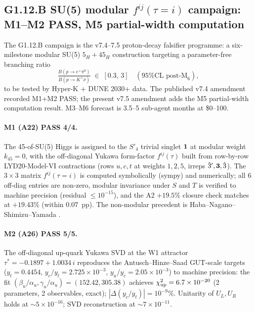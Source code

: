 \documentclass[a4paper,11pt]{article}
\newcommand{\Spf}{S'_4}
\theoremstyle{definition}
\theoremstyle{remark}
\begin{document}
\subsection{G1.12.B SU(5) modular $f^{ij}(\tau=i)$
            campaign: M1--M2 PASS, M5 partial-width computation}
\label{sec:G112B}

The G1.12.B campaign \cite{A18scoping} is the v7.4--7.5
proton-decay falsifier programme: a six-milestone modular SU(5)
$5_H+45_H$ construction targeting a parameter-free branching
ratio
\[
  \tfrac{B(p\to e^+\pi^0)}{B(p\to K^+\bar\nu)} \;\in\; [0.3,\,3]
  \quad(\text{95\% CL post-M}_6),
\]
to be tested by Hyper-K + DUNE 2030+ data.  The published v7.4
amendment recorded M1+M2 PASS; the present v7.5 amendment adds
the M5 partial-width computation result.  M3--M6 forecast is
3.5--5 sub-agent months at \$0--100.

\paragraph{M1 (A22) PASS 4/4.}  The 45-of-SU(5) Higgs is assigned
to the $\Spf$ trivial singlet ${\bf 1}$ at modular weight
$k_{45}=0$, with the off-diagonal Yukawa form-factor
$f^{ij}(\tau)$ built from row-by-row LYD20-Model-VI contractions
(rows $u,c,t$ at weights $1,2,5$, irreps
$\hat 3',{\bf 3},\hat 3$).  The $3\times 3$ matrix
$f^{ij}(\tau=i)$ is computed symbolically (sympy) and
numerically; all 6 off-diag entries are non-zero, modular
invariance under $S$ and $T$ is verified to machine precision
(residual $\le 10^{-15}$), and the A2 $+19.5\%$ closure check
matches at $+19.43\%$ (within $0.07$~pp).  The non-modular
precedent is Haba--Nagano--Shimizu--Yamada
\cite{HabaNagShim24}.

\paragraph{M2 (A26) PASS 5/5.}  The off-diagonal up-quark Yukawa
SVD at the W1 attractor $\tau^{*}=-0.1897+1.0034\,i$ reproduces
the Antusch--Hinze--Saad GUT-scale
targets~\cite{AHS25} ($y_t=0.4454$, $y_c/y_t=2.725\times 10^{-3}$,
$y_u/y_c=2.05\times 10^{-3}$) to machine precision: the fit
$(\beta_u/\alpha_u,\gamma_u/\alpha_u)=(152.42,305.38)$ achieves
$\chi^2_{\rm up}=6.7\times 10^{-20}$ (2 parameters, 2 observables,
exact); $|\Delta(y_c/y_t)|=10^{-9}\%$.  Unitarity of $U_L,U_R$
holds at $\sim 5\times 10^{-16}$; SVD reconstruction at
$\sim 7\times 10^{-11}$.
\end{document}
